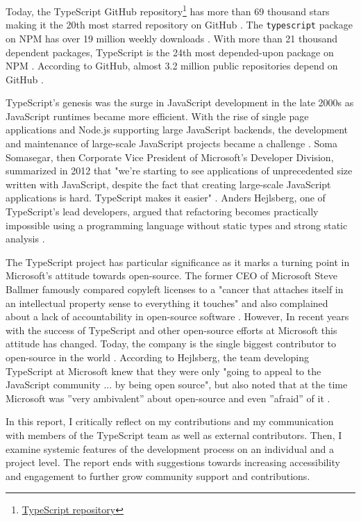 \documentclass[12pt]{scrartcl}
\def\code#1{\texttt{\frenchspacing#1}}
\begin{document}
Today, the TypeScript GitHub repository\footnote{\href{https://github.com/Microsoft/TypeScript}{TypeScript repository}} has more than 69 thousand stars making it the 20th most starred repository on GitHub \cite{RepositoriesRanking}. The \code{typescript} package on NPM has over 19 million weekly downloads \cite{Package}. With more than 21 thousand dependent packages, TypeScript is the 24th most depended-upon package on NPM \cite{PackageDependents}. According to GitHub, almost 3.2 million public repositories depend on GitHub \cite{NetworkDependents}.

TypeScript's genesis was the surge in JavaScript development in the late 2000s as JavaScript runtimes became more efficient. With the rise of single page applications and Node.js supporting large JavaScript backends, the development and maintenance of large-scale JavaScript projects became a challenge \cite{Foley2012a}. Soma Somasegar, then Corporate Vice President of Microsoft’s Developer Division, summarized in 2012 that "we’re starting to see applications of unprecedented size written with JavaScript, despite the fact that creating large-scale JavaScript applications is hard. TypeScript makes it easier" \cite{Foley2012}. Anders Hejlsberg, one of TypeScript's lead developers, argued that refactoring becomes practically impossible using a programming language without static types and strong static analysis \cite{Cassel2019}.

The TypeScript project has particular significance as it marks a turning point in Microsoft's attitude towards open-source. The former CEO of Microsoft Steve Ballmer famously compared copyleft licenses to a "cancer that attaches itself in an intellectual property sense to everything it touches" \cite{ThomasCGreene2001} and also complained about a lack of accountability in open-source software \cite{JoeMcKendrick2003}. However, In recent years with the success of TypeScript and other open-source efforts at Microsoft this attitude has changed. Today, the company is the single biggest contributor to open-source in the world \cite{TomWarren2020}. According to Hejlsberg, the team developing TypeScript at Microsoft knew that they were only "going to appeal to the JavaScript community ... by being open source", but also noted that at the time Microsoft was ”very ambivalent” about open-source and even ”afraid” of it \cite{Tung2020}.

In this report, I critically reflect on my contributions and my communication with members of the TypeScript team as well as external contributors. Then, I examine systemic features of the development process on an individual and a project level. The report ends with suggestions towards increasing accessibility and engagement to further grow community support and contributions.
\end{document}
